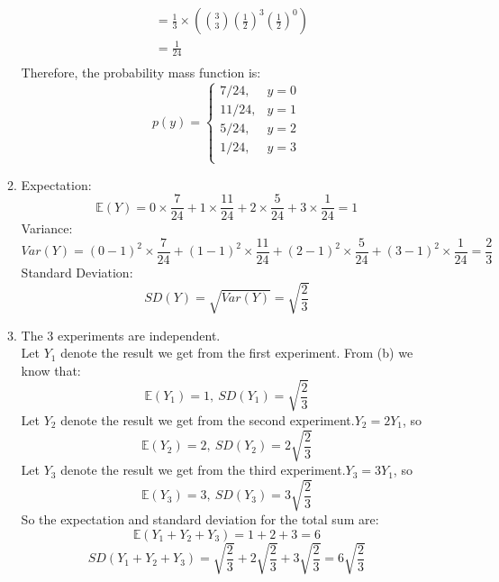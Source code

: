\documentclass[11pt]{article}
\begin{document}
\begin{enumerate}[label=\textbf{Question \arabic*:},start=1]
\begin{enumerate}
\begin{equation}
\begin{split}
& = \frac{1}{3} \times ({3 \choose 3}(\frac{1}{2})^3(\frac{1}{2})^0) \\
& = \frac{1}{24} \\
\end{split}
\end{equation}
Therefore, the probability mass function is:
  \[
    p(y) = \begin{cases}
        7/24, & y = 0\\
        11/24, & y = 1\\
        5/24, & y = 2\\
        1/24 , & y = 3\\
        \end{cases}
  \]

\item Expectation:
\[
\mathbb{E}(Y) = 0 \times \frac{7}{24} + 1 \times \frac{11}{24} + 2 \times \frac{5}{24} + 3 \times \frac{1}{24} = 1
\]
Variance:
\[
Var(Y) = (0 - 1)^2 \times \frac{7}{24} + (1 - 1)^2 \times \frac{11}{24} + (2 - 1)^2 \times \frac{5}{24} + (3 - 1)^2 \times \frac{1}{24} = \frac{2}{3}
\]
Standard Deviation:
\[
SD(Y) = \sqrt{Var(Y)} = \sqrt{\frac{2}{3}}
\]


\item The 3 experiments are independent.\\
Let \(Y_1\) denote the result we get from the first experiment. From (b) we know that:
\[
\mathbb{E}(Y_1) = 1, \ SD(Y_1) = \sqrt{\frac{2}{3}} 
\]
Let \(Y_2\) denote the result we get from the second experiment.\(Y_2 = 2 Y_1\), so
\[
\mathbb{E}(Y_2) = 2, \ SD(Y_2) = 2\sqrt{\frac{2}{3}}
\]
Let \(Y_3\) denote the result we get from the third experiment.\(Y_3 = 3 Y_1\), so
\[
\mathbb{E}(Y_3) = 3, \ SD(Y_3) = 3 \sqrt{\frac{2}{3}}
\]
So the expectation and standard deviation for the total sum are:
\[
\mathbb{E}(Y_1 + Y_2 + Y_3) = 1 + 2 + 3 = 6
\]
\[
SD(Y_1 + Y_2 + Y_3) = \sqrt{\frac{2}{3}} + 2\sqrt{\frac{2}{3}} + 3\sqrt{\frac{2}{3}} = 6\sqrt{\frac{2}{3}}
\]
\end{enumerate}




\end{enumerate}
\end{document}
